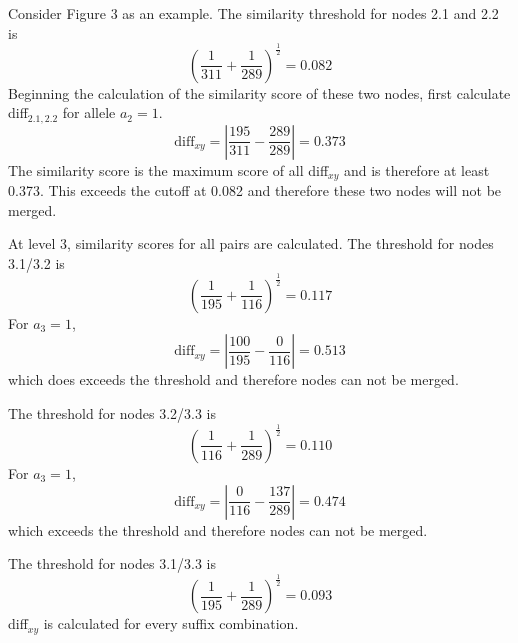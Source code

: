 \documentclass[a4paper,11pt,twoside,abstraction,titlepage]{article}
\begin{document}
\noindent Consider Figure 3 as an example.   The similarity threshold for nodes 2.1 and 2.2 is 
\vspace{-5pt}
\begin{equation*}
\left(\frac{1}{311}+\frac{1}{289}\right)^{\frac{1}{2}} = 0.082
\end{equation*}
Beginning the calculation of the similarity score of these two nodes, first calculate diff$_{2.1,2.2}$ for allele $a_2=1$.
\begin{equation*}
\mbox{diff}_{xy} = \left|\frac{195}{311}-\frac{289}{289}\right| = 0.373
\end{equation*}
The similarity score is the maximum score of all diff$_{xy}$ and is therefore at least 0.373.  This exceeds the cutoff at 0.082 and therefore these two nodes will not be merged.

\vspace{8pt}
\noindent At level 3, similarity scores for all pairs are calculated.  The threshold for nodes 3.1/3.2 is 
\vspace{-5pt}
\begin{equation*}
\left(\frac{1}{195}+\frac{1}{116}\right)^{\frac{1}{2}} = 0.117
\end{equation*}
For $a_3=1$,
\begin{equation*}
\mbox{diff}_{xy} = \left|\frac{100}{195}-\frac{0}{116}\right| = 0.513
\end{equation*}
which does exceeds the threshold and therefore nodes can not be merged.

\vspace{8pt}
\noindent The threshold for nodes 3.2/3.3 is
\vspace{-5pt}
\begin{equation*}
\left(\frac{1}{116}+\frac{1}{289}\right)^{\frac{1}{2}} = 0.110
\end{equation*}
For $a_3=1$,
\begin{equation*}
\mbox{diff}_{xy} = \left|\frac{0}{116}-\frac{137}{289}\right| = 0.474
\end{equation*}
which exceeds the threshold and therefore nodes can not be merged.

\vspace{8pt}
\noindent The threshold for nodes 3.1/3.3 is
\vspace{-5pt}
\begin{equation*}
\left(\frac{1}{195}+\frac{1}{289}\right)^{\frac{1}{2}} = 0.093
\end{equation*}
diff$_{xy}$ is calculated for every suffix combination.
\vspace{8pt}
\end{document}
